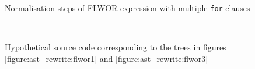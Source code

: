 \begin{figure}[!h]
{{			\label{figure:ast_rewrite:flwor2}
		}
		\quad
	}
	\caption{Normalisation steps of FLWOR expression with multiple \texttt{for}-clauses}
\end{figure}

\begin{figure}[!h]
	\centering
	\mbox{
		\quad
	}
	\caption{Hypothetical source code corresponding to the trees in figures
		\ref{figure:ast_rewrite:flwor1} and \ref{figure:ast_rewrite:flwor3}}
	\label{figure:ast_rewrite:flwor_src}
\end{figure}

